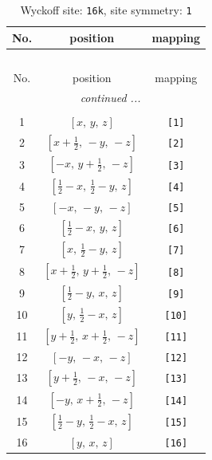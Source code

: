 \documentclass[fleqn,8pt]{jsarticle}
\begin{document}
\begin{longtable}{ccc}
\caption{Wyckoff site: {\tt 16k}, site symmetry: {\tt 1}}
 \\
 \hline \hline
No. & position & mapping \\ \hline \endfirsthead

\multicolumn{2}{l}{\tablename\ \thetable{}} \\
 \hline \hline
No. & position & mapping \\ \hline \endhead

 \hline \hline
\multicolumn{2}{r}{\footnotesize\it continued ...} \\ \endfoot

 \hline \hline
\multicolumn{2}{r}{} \\ \endlastfoot

1 & $\left[ x,\, y,\, z \right]$ & {\tt [1]} \\ \hline
2 & $\left[ x + \frac{1}{2},\, - y,\, - z \right]$ & {\tt [2]} \\ \hline
3 & $\left[ - x,\, y + \frac{1}{2},\, - z \right]$ & {\tt [3]} \\ \hline
4 & $\left[ \frac{1}{2} - x,\, \frac{1}{2} - y,\, z \right]$ & {\tt [4]} \\ \hline
5 & $\left[ - x,\, - y,\, - z \right]$ & {\tt [5]} \\ \hline
6 & $\left[ \frac{1}{2} - x,\, y,\, z \right]$ & {\tt [6]} \\ \hline
7 & $\left[ x,\, \frac{1}{2} - y,\, z \right]$ & {\tt [7]} \\ \hline
8 & $\left[ x + \frac{1}{2},\, y + \frac{1}{2},\, - z \right]$ & {\tt [8]} \\ \hline
9 & $\left[ \frac{1}{2} - y,\, x,\, z \right]$ & {\tt [9]} \\ \hline
10 & $\left[ y,\, \frac{1}{2} - x,\, z \right]$ & {\tt [10]} \\ \hline
11 & $\left[ y + \frac{1}{2},\, x + \frac{1}{2},\, - z \right]$ & {\tt [11]} \\ \hline
12 & $\left[ - y,\, - x,\, - z \right]$ & {\tt [12]} \\ \hline
13 & $\left[ y + \frac{1}{2},\, - x,\, - z \right]$ & {\tt [13]} \\ \hline
14 & $\left[ - y,\, x + \frac{1}{2},\, - z \right]$ & {\tt [14]} \\ \hline
15 & $\left[ \frac{1}{2} - y,\, \frac{1}{2} - x,\, z \right]$ & {\tt [15]} \\ \hline
16 & $\left[ y,\, x,\, z \right]$ & {\tt [16]} \\
\end{longtable}
\end{document}
